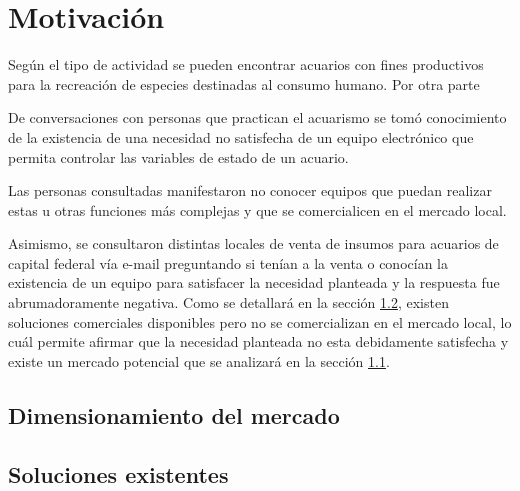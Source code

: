 \section{Motivación}

Según el tipo de actividad se pueden encontrar acuarios con fines productivos para la recreación de especies destinadas al consumo humano.  Por otra parte

De conversaciones con personas que practican el acuarismo se tomó conocimiento de la existencia de una necesidad no satisfecha de un equipo electrónico que permita controlar las variables de estado de un acuario. 
 
Las personas consultadas manifestaron no conocer equipos que puedan realizar estas u otras funciones más complejas y que se comercialicen en el mercado local.  

Asimismo, se consultaron distintas locales de venta de insumos para acuarios de capital federal vía e-mail preguntando si tenían a la venta o conocían la existencia de un equipo para satisfacer la necesidad planteada y la respuesta fue abrumadoramente negativa. Como se detallará en la sección \ref{sec:existentes}, existen soluciones comerciales disponibles pero no se comercializan en el mercado local, lo cuál permite afirmar que la necesidad planteada no esta debidamente satisfecha y existe un mercado potencial que se analizará en la sección \ref{sec:mercado}.
%

\subsection{Dimensionamiento del mercado}
\label{sec:mercado}

\subsection{Soluciones existentes}
\label{sec:existentes}

